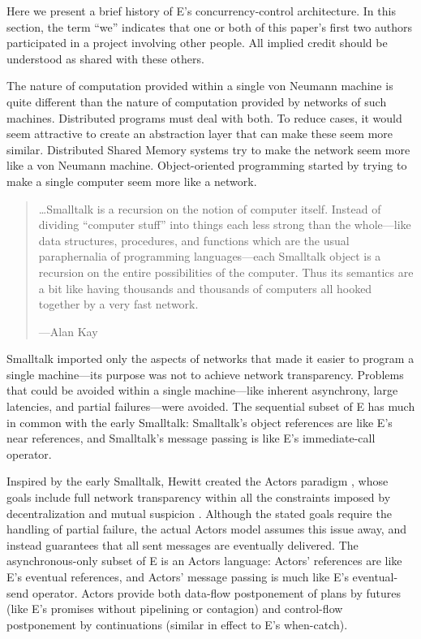 \documentclass{llncs}
\begin{document}
Here we present a brief history of E's concurrency-control
architecture. In this section, the term ``we'' indicates that one or
both of this paper's first two authors participated in a project
involving other people. All implied credit should be understood as
shared with these others.

 The nature of computation provided within a single
von Neumann machine is quite different than the nature of computation
provided by networks of such machines. Distributed programs must deal
with both. To reduce cases, it would seem attractive to create an
abstraction layer that can make these seem more similar. Distributed
Shared Memory systems try to make the network seem more like a von
Neumann machine. Object-oriented programming started by trying to make
a single computer seem more like a network.
%
\begin{quotation}
\ldots Smalltalk is a recursion on the notion of computer
itself. Instead of dividing ``computer stuff'' into things each less
strong than the whole---like data structures, procedures, and
functions which are the usual paraphernalia of programming
languages---each Smalltalk object is a recursion on the entire
possibilities of the computer. Thus its semantics are a bit like
having thousands and thousands of computers all hooked together by a
very fast network.
\begin{flushright}
---Alan Kay \cite{kay:smallhistory}
\end{flushright}
\end{quotation}
%
Smalltalk imported only the aspects of networks that made it easier to
program a single machine---its purpose was not to achieve network
transparency. Problems that could be avoided within a single
machine---like inherent asynchrony, large latencies, and partial
failures---were avoided. The sequential subset of E
has much in common with the early Smalltalk: Smalltalk's object
references are like E's near references, and Smalltalk's message
passing is like E's immediate-call operator.

 Inspired by the early Smalltalk, Hewitt created the
Actors paradigm \cite{hewitt:actors}, whose goals include full network
transparency within all the constraints imposed by decentralization
and mutual suspicion \cite{hewitt:challenge}. Although the stated
goals require the handling of partial failure, the actual Actors model
assumes this issue away, and instead guarantees that all sent messages
are eventually delivered. The asynchronous-only subset of E is an
Actors language: Actors' references are like E's eventual references,
and Actors' message passing is much like E's eventual-send
operator. Actors provide both data-flow postponement of plans by
futures (like E's promises without pipelining or contagion) and
control-flow postponement by continuations (similar in effect to E's
when-catch).
\end{document}
